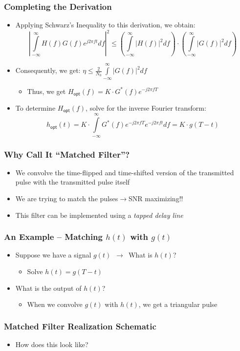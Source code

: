 \documentclass[10pt]{beamer}
\begin{document}
\frame
{
  \frametitle{Completing the Derivation}

  \begin{itemize}
    \item Applying Schwarz's Inequality to this derivation, we obtain:
    \begin{equation}
        \left|\int\limits_{-\infty}^{\infty}H(f)G(f)e^{j2\pi{f}{t}}df\right|^2\le\left(\int\limits_{-\infty}^{\infty}|H(f)|^2df\right)\cdot\left(\int\limits_{-\infty}^{\infty}|G(f)|^2df\right)\nonumber
    \end{equation}
    \item Consequently, we get: $\eta\le\frac{2}{N_0}\int\limits_{-\infty}^{\infty}|G(f)|^2df$
    \begin{itemize}
        \item Thus, we get $H_{\mathsf{opt}}(f)=K\cdot{G}^{\ast}(f)e^{-j2\pi{fT}}$
    \end{itemize}
    \item To determine $H_{\mathsf{opt}}(f)$, solve for the inverse Fourier transform:
    \begin{equation}
        h_{\mathsf{opt}}(t)=K\cdot\int\limits_{-\infty}^{\infty}G^{\ast}(f)e^{-j2\pi{f}{T}}e^{-j2\pi{f}{t}}df=K\cdot{g(T-t)}\nonumber
    \end{equation}
  \end{itemize}

}

\frame
{
  \frametitle{Why Call It ``Matched Filter''?}

    \begin{itemize}
        \item We convolve the time-flipped and time-shifted version of the transmitted pulse with the transmitted pulse itself
        \item We are trying to match the pulses$\rightarrow$SNR maximizing!!
        \item This filter can be implemented using a {\it tapped delay line}
    \end{itemize}


}


\frame
{
  \frametitle{An Example -- Matching $h(t)$ with $g(t)$}


  \begin{itemize}
     \item Suppose we have a signal $g(t)$~$\rightarrow$~What is $h(t)$?
     \begin{itemize}
        \item Solve $h(t)=g(T-t)$
     \end{itemize}
     \item What is the output of $h(t)$?
     \begin{itemize}
         \item When we convolve $g(t)$ with $h(t)$, we get a triangular pulse
     \end{itemize}
  \end{itemize}

}


\frame
{
  \frametitle{Matched Filter Realization Schematic}

\begin{itemize}
 \item How does this look like?
\end{itemize}

}
\end{document}
